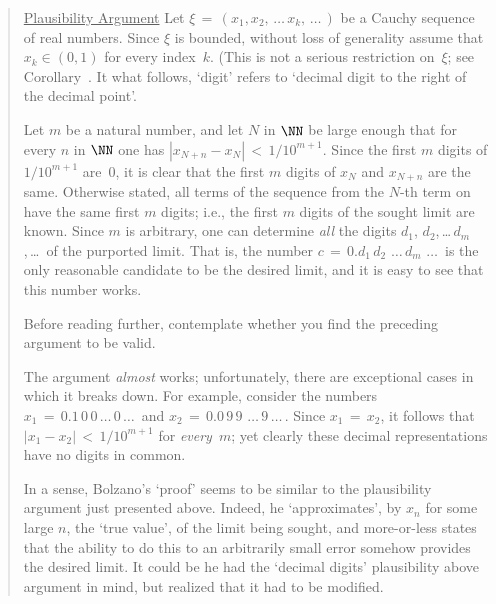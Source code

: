 \begin{quotation}
{\VA


       \h \underline{Plausibility Argument} Let ${\xi} \,=\, (x_{1}, x_{2},\,{\ldots}\,x_{k}, \,{\ldots}\,)$ be a Cauchy sequence of real numbers. 
    Since ${\xi}$ is bounded, without loss of generality assume that $x_{k}{\in}(0,1)$ for every index~$k$.
    (This is not a serious restriction on~${\xi}$; see Corollary~.
    It what follows, `digit' refers to `decimal digit to the right of the decimal point'.

        Let $m$ be a natural number, and let $N$ in ${\NN}$ be large enough that for every $n$ in ${\NN}$ one has $|x_{N+n}-x_{N}|\,<\,1/10^{m+1}$.
    Since the first $m$ digits of $1/10^{m+1}$ are~$0$, it is clear that the first $m$ digits of $x_{N}$ and $x_{N+n}$ are the same.
    Otherwise stated, all terms of the sequence from the $N$-th term on have the same first $m$ digits; i.e., the first $m$ digits of the sought limit are known.
    Since $m$ is arbitrary, one can determine {\em all} the digits $d_{1}$, $d_{2}$,\,{\ldots}\,$d_{m}$,\,{\ldots}\, of the purported limit.
    That is, the number $c \,=\, 0.d_{1}\,d_{2}\,\,{\ldots}\,d_{m}\,\,{\ldots}\,$
    is the only reasonable candidate to be the desired limit, and it is easy to see that this number works.

\VA

        Before reading further, contemplate whether you find the preceding argument to be valid.

\VV

        The argument {\em almost} works; unfortunately, there are exceptional cases in which it breaks down.
    For example, consider the numbers $x_{1} \,=\, 0.1\,0\,0\,{\ldots}\,0\,{\ldots}\,$
    and $x_{2} \,=\, 0.0\,9\,9\,\,{\ldots}\,9\,{\ldots}\,$. Since $x_{1} \,=\, x_{2}$,
    it follows that $|x_{1}-x_{2}|\,<\,1/10^{m+1}$ for {\em every}~$m$; yet clearly these decimal representations have no digits in common.

        In a sense, Bolzano's `proof' seems to be similar to the plausibility argument just presented above.
    Indeed, he `approximates', by $x_{n}$ for some large $n$, the `true value', of the limit being sought,
    and more-or-less states that the ability to do this to an arbitrarily small error somehow provides the desired limit.
    It could be he had the `decimal digits' plausibility above argument in mind, but realized that it had to be modified.

}
\end{quotation}
